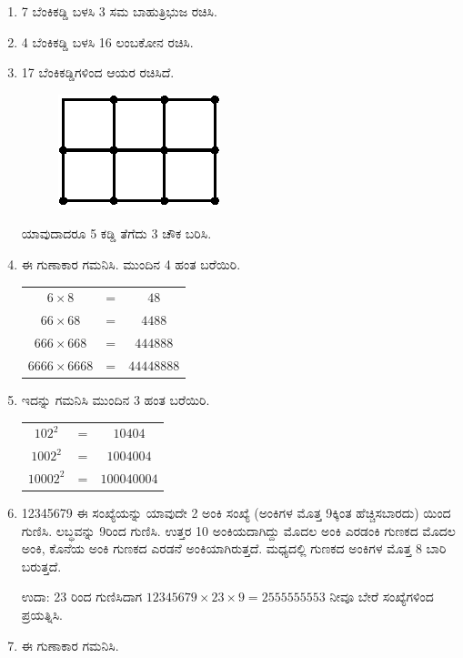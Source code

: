 \begin{enumerate}
\item 7 ಬೆಂಕಿಕಡ್ಡಿ ಬಳಸಿ 3 ಸಮ ಬಾಹುತ್ರಿಭುಜ ರಚಿಸಿ. 

\item 4 ಬೆಂಕಿಕಡ್ಡಿ ಬಳಸಿ 16 ಲಂಬಕೋನ ರಚಿಸಿ. 

\item 17 ಬೆಂಕಿಕಡ್ಡಿಗಳಿಂದ ಆಯರ ರಚಿಸಿದೆ. 
\begin{figure}[H]
\centering
\includegraphics[scale=0.9]{images/chap9/q17.eps}
\end{figure}

ಯಾವುದಾದರೂ 5 ಕಡ್ಡಿ ತೆಗೆದು 3 ಚೌಕ ಬರಿಸಿ. 

\item ಈ ಗುಣಾಕಾರ ಗಮನಿಸಿ. ಮುಂದಿನ 4 ಹಂತ ಬರೆಯಿರಿ. 

{\fontsize{11pt}{13pt}\selectfont
\begin{tabular}[t]{ccc}
$6\times 8$ & = & $48$\\
$66\times 68$ & = & $4488$\\
$666\times 668$ & = & $444888$\\
$6666\times 6668$ & = & $44448888$\\
\end{tabular}}\relax

\item ಇದನ್ನು ಗಮನಿಸಿ ಮುಂದಿನ 3 ಹಂತ ಬರೆಯಿರಿ. 

\begin{tabular}[t]{ccc}
$102^{2}$ & = & $10404$\\
$1002^{2}$ & = & $1004004$\\
$10002^{2}$ & = & $100040004$\\
\end{tabular}

\item 12345679 ಈ ಸಂಖ್ಯೆಯನ್ನು ಯಾವುದೇ 2 ಅಂಕಿ ಸಂಖ್ಯೆ (ಅಂಕಿಗಳ ಮೊತ್ತ 9ಕ್ಕಿಂತ ಹೆಚ್ಚಿಸಬಾರದು) ಯಿಂದ ಗುಣಿಸಿ. ಲಬ್ಧವನ್ನು 9ರಿಂದ ಗುಣಿಸಿ. ಉತ್ತರ 10 ಅಂಕಿಯದಾಗಿದ್ದು ಮೊದಲ ಅಂಕಿ ಎರಡಂಕಿ ಗುಣಕದ ಮೊದಲ ಅಂಕಿ, ಕೊನೆಯ ಅಂಕಿ ಗುಣಕದ ಎರಡನೆ ಅಂಕಿಯಾಗಿರುತ್ತದೆ. ಮಧ್ಯದಲ್ಲಿ ಗುಣಕದ ಅಂಕಿಗಳ ಮೊತ್ತ 8 ಬಾರಿ ಬರುತ್ತದೆ. 

ಉದಾ: 23 ರಿಂದ ಗುಣಿಸಿದಾಗ $12345679\times 23\times 9 = 2555555553$ ನೀವೂ ಬೇರೆ ಸಂಖ್ಯೆಗಳಿಂದ ಪ್ರಯತ್ನಿಸಿ. 

\item ಈ ಗುಣಾಕಾರ ಗಮನಿಸಿ. 


\end{enumerate}

